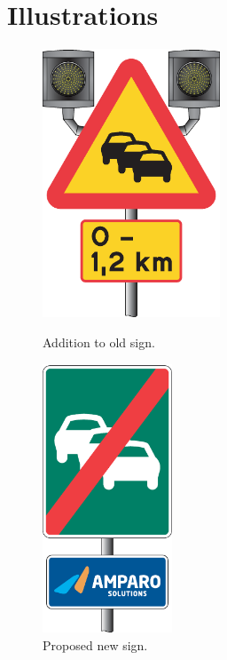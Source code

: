 \chapter{Illustrations}\label{app:illustrations}


\begin{subfigures}
\begin{figure}[!ht]
  \centering
  \begin{minipage}{0.45\linewidth}
  \centering
   \includegraphics[height=8cm]{images/queue1}
  \caption{Addition to old sign.}
  \label{fig-queue1}
  \end{minipage}\hspace{0.5cm}
  \begin{minipage}{0.45\linewidth}
   \centering
   \includegraphics[height=8cm]{images/queue2}
  \caption{Proposed new sign.}
  \label{fig-queue2}
  \end{minipage}
 \end{figure}
 \begin{figure}\centering
    \begin{minipage}{0.45\linewidth}

\end{minipage}
\end{figure}
\end{subfigures}
